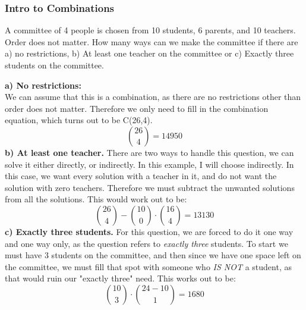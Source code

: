         \subsubsection{Intro to Combinations}
            
            \begin{example}
                A committee of 4 people is chosen from 10 students, 6 parents, and 10 teachers. Order does not matter. How many ways can we make the committee if there are a) no restrictions, b) At least one teacher on the committee or c) Exactly three students on the committee.
            \end{example}
            \textbf{a) No restrictions:}\\
            We can assume that this is a combination, as there are no restrictions other than order does not matter. Therefore we only need to fill in the combination equation, which turns out to be C(26,4). 
            $$\binom{26}{4} = 14950$$
            \textbf{b) At least one teacher.}
            There are two ways to handle this question, we can solve it either directly, or indirectly. In this example, I will choose indirectly. In this case, we want every solution with a teacher in it, and do not want the solution with zero teachers. Therefore we must subtract the unwanted solutions from all the solutions. This would work out to be:
            $$\binom{26}{4} - \binom{10}{0}\cdot\binom{16}{4} = 13130$$
            \textbf{c) Exactly three students.}
            For this question, we are forced to do it one way and one way only, as the question refers to \emph{exactly three} students. To start we must have 3 students on the committee, and then since we have one space left on the committee, we must fill that spot with someone who \emph{IS NOT} a student, as that would ruin our "exactly three" need. This works out to be:
            $$\binom{10}{3}\cdot\binom{24-10}{1} = 1680$$
        